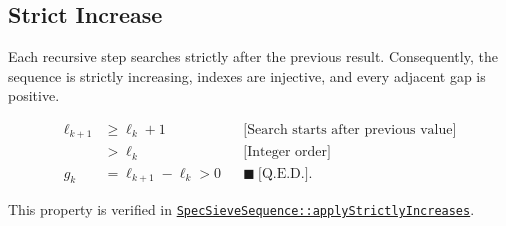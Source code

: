 \subsection{Strict Increase}
\label{sec:strict-increase}

Each recursive step searches strictly after the previous result.
Consequently, the sequence is strictly increasing, indexes are
injective, and every adjacent gap is positive.

\begin{equation*}
\begin{aligned}
\ell_{k+1}
&\ge \ell_k+1
  &&\text{[Search starts after previous value]} \\
&\gt \ell_k
  &&\text{[Integer order]} \\
g_k
&=\ell_{k+1}-\ell_k\gt0
  &&\blacksquare\ \text{[Q.E.D.]}.
\end{aligned}
\end{equation*}

This property is verified in
\href{https://github.com/thiagomata/prime-numbers/blob/master/src/main/scala/v1/chapter6/sieve/seq/spec/SpecSieveSequence.scala}{\texttt{SpecSieveSequence::applyStrictlyIncreases}}.
